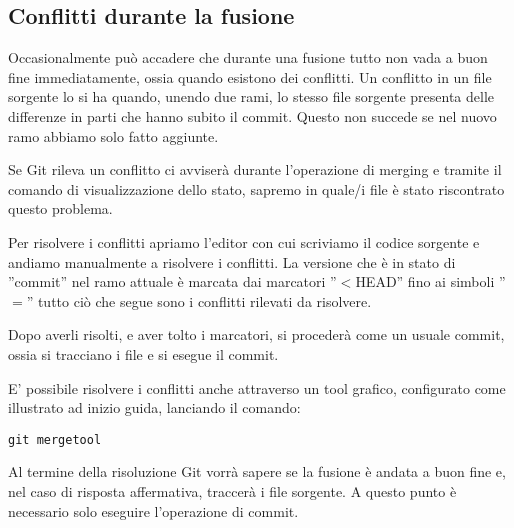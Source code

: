\subsection{Conflitti durante la fusione}
Occasionalmente può accadere che durante una fusione tutto non vada a buon fine immediatamente, ossia quando esistono dei conflitti. Un conflitto in un file sorgente lo si ha quando, unendo due rami, lo stesso file sorgente presenta delle differenze in parti che hanno subito il commit. Questo non succede se nel nuovo ramo abbiamo solo fatto aggiunte.

Se Git rileva un conflitto ci avviserà durante l'operazione di merging e tramite il comando di visualizzazione dello stato, sapremo in quale/i file è stato riscontrato questo problema.

Per risolvere i conflitti apriamo l'editor con cui scriviamo il codice sorgente e andiamo manualmente a risolvere i conflitti. La versione che è in stato di ''commit'' nel ramo attuale è marcata dai marcatori ''$<$HEAD'' fino ai simboli ''$=$'' tutto ciò che segue sono i conflitti rilevati da risolvere.

Dopo averli risolti, e aver tolto i marcatori, si procederà come un usuale commit, ossia si tracciano i file e si esegue il commit.

E' possibile risolvere i conflitti anche attraverso un tool grafico, configurato come illustrato ad inizio guida, lanciando il comando:

\begin{center}
\texttt{git mergetool}
\end{center}

Al termine della risoluzione Git vorrà sapere se la fusione è andata a buon fine e, nel caso di risposta affermativa, traccerà i file sorgente. A questo punto è necessario solo eseguire l'operazione di commit.
